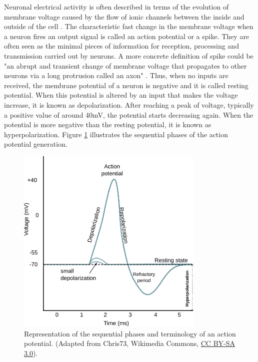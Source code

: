Neuronal electrical activity is often described in terms of the evolution of membrane voltage caused by the flow of ionic channels between the inside and outside of the cell \parencite{kandel_principles_2012}. The characteristic fast change in the membrane voltage when a neuron fires an output signal is called an action potential or a spike. They are often seen as the minimal pieces of information for reception, processing and transmission carried out by neurons. A more concrete definition of spike could be "an abrupt and transient change of membrane voltage that propagates to other neurons via a long protrusion called an axon" \parencite{izhikevich_dynamical_2007}. Thus, when no inputs are received, the membrane potential of a neuron is negative and it is called resting potential. When this potential is altered by an input that makes the voltage increase, it is known as depolarization. After reaching a peak of voltage, typically a positive value of around 40mV, the potential starts decreasing again. When the potential is more negative than the resting potential, it is known as hyperpolarization. Figure \ref{fig:action potential} illustrates the sequential phases of the action potential generation. 

\begin{figure}[htb!]
    \centering
    \includegraphics[width=0.8\textwidth]{img/intro/action_potential.pdf}
    \caption{Representation of the sequential  phases and terminology of an action potential. (Adapted from Chris73, Wikimedia Commons, \href{https://creativecommons.org/licenses/by-sa/3.0/}{CC BY-SA 3.0}). }
    \label{fig:action potential}
\end{figure}

